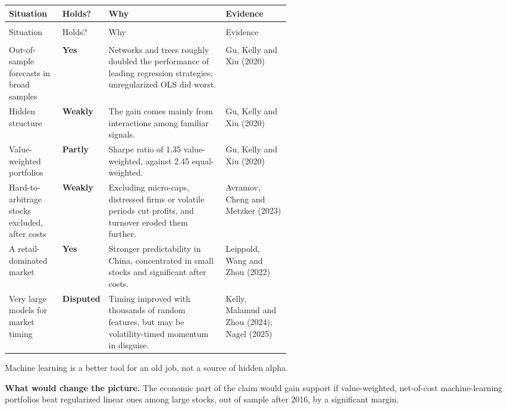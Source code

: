 {\small
\begin{longtable}{@{}>{\raggedright\arraybackslash}p{0.19\linewidth}>{\raggedright\arraybackslash}p{0.13\linewidth}>{\raggedright\arraybackslash}p{}>{\raggedright\arraybackslash}p{0.23\linewidth}@{}}
\toprule
Situation & Holds? & Why & Evidence \\
\midrule
\endfirsthead
\multicolumn{4}{@{}l}{\emph{(continued)}} \\
\toprule
Situation & Holds? & Why & Evidence \\
\midrule
\endhead
\midrule
\multicolumn{4}{r@{}}{\emph{(continued on the next page)}} \\
\endfoot
\bottomrule
\endlastfoot
Out-of-sample forecasts in broad samples & \textbf{Yes} & Networks and trees roughly doubled the performance of leading regression strategies; unregularized OLS did worst. & Gu, Kelly and Xiu (2020) \\*
\addlinespace[3pt]
Hidden structure & \textbf{Weakly} & The gain comes mainly from interactions among familiar signals. & Gu, Kelly and Xiu (2020) \\
\addlinespace[3pt]
Value-weighted portfolios & \textbf{Partly} & Sharpe ratio of 1.35 value-weighted, against 2.45 equal-weighted. & Gu, Kelly and Xiu (2020) \\
\addlinespace[3pt]
Hard-to-arbitrage stocks excluded, after costs & \textbf{Weakly} & Excluding micro-caps, distressed firms or volatile periods cut profits, and turnover eroded them further. & Avramov, Cheng and Metzker (2023) \\
\addlinespace[3pt]
A retail-dominated market & \textbf{Yes} & Stronger predictability in China, concentrated in small stocks and significant after costs. & Leippold, Wang and Zhou (2022) \\*
\addlinespace[3pt]
Very large models for market timing & \textbf{Disputed} & Timing improved with thousands of random features, but may be volatility-timed momentum in disguise. & Kelly, Malamud and Zhou (2024); Nagel (2025) \\
\end{longtable}
\addtocounter{table}{-1}%
}

Machine learning is a better tool for an old job, not a source of hidden alpha.

\textbf{What would change the picture.} The economic part of the claim would gain support if value-weighted, net-of-cost machine-learning portfolios beat regularized linear ones among large stocks, out of sample after 2016, by a significant margin.


